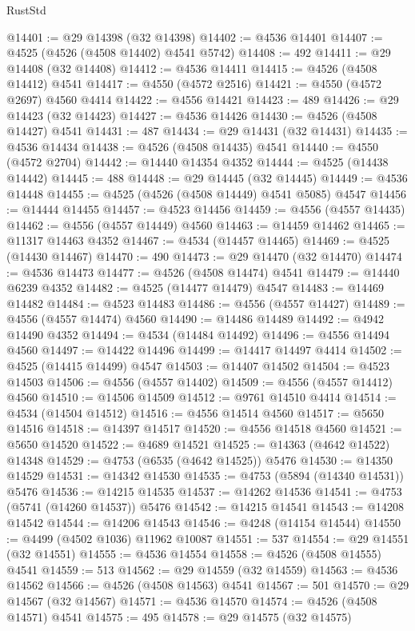 \begin{lexlean}{RustStd}
\begin{coremodule}
{\begin{coremodule}
{{{{{{{{{{{{{{{{{{{{{{{{{{{{{{{{{{{{{{{{{{{{{{{{{{{{{{{@14401 := @29 @14398 (@32 @14398)
@14402 := @4536 @14401
@14407 := @4525 (@4526 (@4508 @14402) @4541 @5742)
@14408 := 492
@14411 := @29 @14408 (@32 @14408)
@14412 := @4536 @14411
@14415 := @4526 (@4508 @14412) @4541
@14417 := @4550 (@4572 @2516)
@14421 := @4550 (@4572 @2697) @4560 @4414
@14422 := @4556 @14421
@14423 := 489
@14426 := @29 @14423 (@32 @14423)
@14427 := @4536 @14426
@14430 := @4526 (@4508 @14427) @4541
@14431 := 487
@14434 := @29 @14431 (@32 @14431)
@14435 := @4536 @14434
@14438 := @4526 (@4508 @14435) @4541
@14440 := @4550 (@4572 @2704)
@14442 := @14440 @14354 @4352
@14444 := @4525 (@14438 @14442)
@14445 := 488
@14448 := @29 @14445 (@32 @14445)
@14449 := @4536 @14448
@14455 := @4525 (@4526 (@4508 @14449) @4541 @5085) @4547
@14456 := @14444 @14455
@14457 := @4523 @14456
@14459 := @4556 (@4557 @14435)
@14462 := @4556 (@4557 @14449) @4560
@14463 := @14459 @14462
@14465 := @11317 @14463 @4352
@14467 := @4534 (@14457 @14465)
@14469 := @4525 (@14430 @14467)
@14470 := 490
@14473 := @29 @14470 (@32 @14470)
@14474 := @4536 @14473
@14477 := @4526 (@4508 @14474) @4541
@14479 := @14440 @6239 @4352
@14482 := @4525 (@14477 @14479) @4547
@14483 := @14469 @14482
@14484 := @4523 @14483
@14486 := @4556 (@4557 @14427)
@14489 := @4556 (@4557 @14474) @4560
@14490 := @14486 @14489
@14492 := @4942 @14490 @4352
@14494 := @4534 (@14484 @14492)
@14496 := @4556 @14494 @4560
@14497 := @14422 @14496
@14499 := @14417 @14497 @4414
@14502 := @4525 (@14415 @14499) @4547
@14503 := @14407 @14502
@14504 := @4523 @14503
@14506 := @4556 (@4557 @14402)
@14509 := @4556 (@4557 @14412) @4560
@14510 := @14506 @14509
@14512 := @9761 @14510 @4414
@14514 := @4534 (@14504 @14512)
@14516 := @4556 @14514 @4560
@14517 := @5650 @14516
@14518 := @14397 @14517
@14520 := @4556 @14518 @4560
@14521 := @5650 @14520
@14522 := @4689 @14521
@14525 := @14363 (@4642 @14522) @14348
@14529 := @4753 (@6535 (@4642 @14525)) @5476
@14530 := @14350 @14529
@14531 := @14342 @14530
@14535 := @4753 (@5894 (@14340 @14531)) @5476
@14536 := @14215 @14535
@14537 := @14262 @14536
@14541 := @4753 (@5741 (@14260 @14537)) @5476
@14542 := @14215 @14541
@14543 := @14208 @14542
@14544 := @14206 @14543
@14546 := @4248 (@14154 @14544)
@14550 := @4499 (@4502 @1036) @11962 @10087
@14551 := 537
@14554 := @29 @14551 (@32 @14551)
@14555 := @4536 @14554
@14558 := @4526 (@4508 @14555) @4541
@14559 := 513
@14562 := @29 @14559 (@32 @14559)
@14563 := @4536 @14562
@14566 := @4526 (@4508 @14563) @4541
@14567 := 501
@14570 := @29 @14567 (@32 @14567)
@14571 := @4536 @14570
@14574 := @4526 (@4508 @14571) @4541
@14575 := 495
@14578 := @29 @14575 (@32 @14575)
}}}}}}}}}}}}}}}}}}}}}}}}}}}}}}}}}}}}}}}}}}}}}}}}}}}}}}}
\end{coremodule}}
\end{coremodule}
\end{lexlean}
